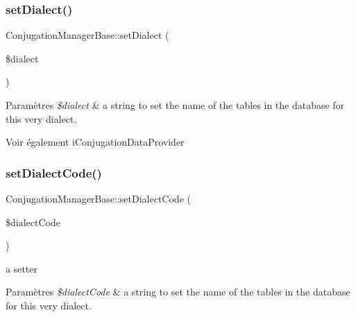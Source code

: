 \hypertarget{class_conjugation_manager_base_a266802b93062d79fa75c460dc72945d8}{}\label{class_conjugation_manager_base_a266802b93062d79fa75c460dc72945d8} 
\subsubsection{\texorpdfstring{set\+Dialect()}{setDialect()}}
{\footnotesize\ttfamily Conjugation\+Manager\+Base\+::set\+Dialect (\begin{DoxyParamCaption}\item[{}]{\$dialect }\end{DoxyParamCaption})}


\begin{DoxyParams}{Paramètres}
{\em \$dialect} & a string to set the name of the tables in the database for this very dialect. \\
\hline
\end{DoxyParams}
\begin{DoxySeeAlso}{Voir également}
i\+Conjugation\+Data\+Provider 
\end{DoxySeeAlso}
\hypertarget{class_conjugation_manager_base_a98c6196247fa40cca8701324bdf36897}{}\label{class_conjugation_manager_base_a98c6196247fa40cca8701324bdf36897} 
\subsubsection{\texorpdfstring{set\+Dialect\+Code()}{setDialectCode()}}
{\footnotesize\ttfamily Conjugation\+Manager\+Base\+::set\+Dialect\+Code (\begin{DoxyParamCaption}\item[{}]{\$dialect\+Code }\end{DoxyParamCaption})}



a setter 


\begin{DoxyParams}{Paramètres}
{\em \$dialect\+Code} & a string to set the name of the tables in the database for this very dialect. \\
\hline
\end{DoxyParams}
\hypertarget{class_conjugation_manager_base_a36a53a9f0bc2114a5429bcf9e3cd351e}{}\label{class_conjugation_manager_base_a36a53a9f0bc2114a5429bcf9e3cd351e} 
